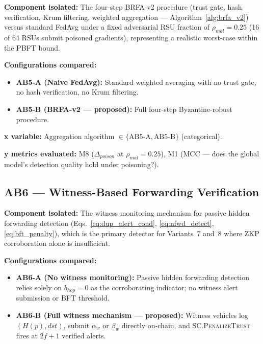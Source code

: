 \documentclass[12pt, a4paper]{report}
\begin{document}
{{\textbf{Component isolated:}
The four-step BRFA-v2 procedure (trust gate, hash
verification, Krum filtering, weighted aggregation —
Algorithm~\ref{alg:brfa_v2}) versus standard FedAvg
under a fixed adversarial RSU fraction of
$\rho_{mal} = 0.25$ (16 of 64 RSUs submit poisoned
gradients), representing a realistic worst-case within
the PBFT bound.

\textbf{Configurations compared:}
\begin{itemize}
    \item \textbf{AB5-A (Naive FedAvg):} Standard
    weighted averaging with no trust gate, no hash
    verification, no Krum filtering.
    \item \textbf{AB5-B (BRFA-v2 — proposed):}
    Full four-step Byzantine-robust procedure.
\end{itemize}

\textbf{x variable:} Aggregation algorithm
$\in \{\text{AB5-A}, \text{AB5-B}\}$ (categorical).

\textbf{y metrics evaluated:} M8 ($\Delta_{poison}$
at $\rho_{mal} = 0.25$), M1 (MCC — does the global
model's detection quality hold under poisoning?).


\subsection{AB6 — Witness-Based Forwarding Verification}
\label{sec:ab6}

\textbf{Component isolated:}
The witness monitoring mechanism for passive hidden
forwarding detection (Eqs.~\ref{eq:dup_alert_cond},
\ref{eq:nfwd_detect}, \ref{eq:bft_penalty}), which
is the primary detector for Variants~7 and~8 where
\ac{ZKP} corroboration alone is insufficient.

\textbf{Configurations compared:}
\begin{itemize}
    \item \textbf{AB6-A (No witness monitoring):}
    Passive hidden forwarding detection relies solely
    on $b_{hop} = 0$ as the corroborating indicator;
    no witness alert submission or BFT threshold.
    \item \textbf{AB6-B (Full witness mechanism —
    proposed):} Witness vehicles log $(H(p), dst)$,
    submit $\alpha_w$ or $\beta_w$ directly on-chain,
    and \textsc{SC.PenalizeTrust} fires at $2f{+}1$
    verified alerts.
\end{itemize}

}}
\end{document}
